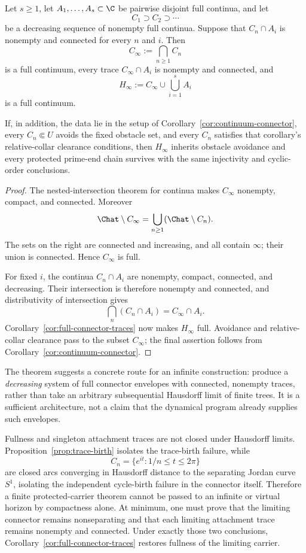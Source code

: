 \begin{theorem}
\label{thm:nested-limit-stability}
Let $s\ge1$, let $A_1,\dots,A_s\subset\C$ be pairwise disjoint full
continua, and let
\[
 C_1\supset C_2\supset\cdots
\]
be a decreasing sequence of nonempty full continua.  Suppose that
$C_n\cap A_i$ is nonempty and connected for every $n$ and $i$.  Then
\[
 C_\infty:=\bigcap_{n\ge1}C_n
\]
is a full continuum, every trace $C_\infty\cap A_i$ is nonempty and
connected, and
\[
 H_\infty:=C_\infty\cup\bigcup_{i=1}^{s}A_i
\]
is a full continuum.

If, in addition, the data lie in the setup of
Corollary~\ref{cor:continuum-connector}, every $C_n\Subset U$ avoids the
fixed obstacle set, and every $C_n$ satisfies that corollary's
relative-collar clearance conditions, then $H_\infty$
inherits obstacle avoidance and every protected prime-end chain survives
with the same injectivity and cyclic-order conclusions.
\end{theorem}

\begin{proof}
The nested-intersection theorem for continua makes $C_\infty$ nonempty,
compact, and connected.  Moreover
\[
 \Chat\setminus C_\infty
 =
 \bigcup_{n\ge1}(\Chat\setminus C_n).
\]
The sets on the right are connected and increasing, and all contain
$\infty$; their union is connected.  Hence $C_\infty$ is full.

For fixed $i$, the continua $C_n\cap A_i$ are nonempty, compact, connected,
and decreasing.  Their intersection is therefore nonempty and connected,
and distributivity of intersection gives
\[
 \bigcap_n(C_n\cap A_i)=C_\infty\cap A_i.
\]
Corollary~\ref{cor:full-connector-traces} now makes $H_\infty$ full.
Avoidance and relative-collar clearance pass to the subset $C_\infty$;
the final assertion follows from
Corollary~\ref{cor:continuum-connector}.
\end{proof}

The theorem suggests a concrete route for an infinite construction:
produce a \emph{decreasing} system of full connector envelopes with
connected, nonempty traces, rather than take an arbitrary subsequential
Hausdorff limit of finite trees.  It is a sufficient architecture, not a
claim that the dynamical program already supplies such envelopes.

\begin{warning}
\label{warn:compactness-gate}
Fullness and singleton attachment traces are not closed under Hausdorff
limits.  Proposition~\ref{prop:trace-birth} isolates the trace-birth
failure, while
\[
C_n=\{e^{it}:1/n\le t\le2\pi\}
\]
are closed arcs converging in Hausdorff distance to the separating Jordan
curve $S^1$, isolating the independent cycle-birth failure in the connector
itself.  Therefore a
finite protected-carrier theorem cannot be passed to an infinite or virtual
horizon by compactness alone.  At minimum, one must prove that the limiting
connector remains nonseparating and that each limiting attachment trace
remains nonempty and connected.  Under exactly those two conclusions,
Corollary~\ref{cor:full-connector-traces} restores fullness of the limiting
carrier.
\end{warning}

